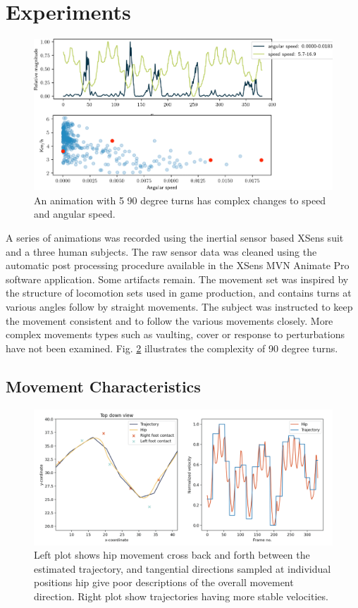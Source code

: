 \section{Experiments}
\begin{figure}
    \centering
    \includegraphics[width=1.0\columnwidth]{img/movement_stats.png}
    \caption{An animation with 5 90 degree turns has complex changes to speed and angular speed.}
    \label{fig:results:trajectory_estimation}
\end{figure}

A series of animations was recorded using the inertial sensor based XSens suit and a three human subjects. The raw sensor data was cleaned using the automatic post processing procedure available in the XSens MVN Animate Pro software application. Some artifacts remain.
The movement set was inspired by the structure of locomotion sets used in game production, and contains turns at various angles follow by straight movements. The subject was instructed to keep the movement consistent and to follow the various movements closely. More complex movements types such as vaulting, cover or response to perturbations have not been examined. Fig. \ref{fig:results:trajectory_estimation} illustrates the complexity of 90 degree turns. 

\subsection{Movement Characteristics}
\begin{figure}
    \centering
    \includegraphics[width=1.0\columnwidth]{img/trajectory_estimation.png}
    \caption{Left plot shows hip movement cross back and forth between the estimated trajectory, and tangential directions sampled at individual positions hip give poor descriptions of the overall movement direction. Right plot show trajectories having more stable velocities.}
    \label{fig:results:trajectory_estimation}
\end{figure}

